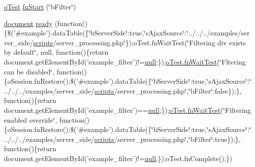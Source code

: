 \begin{DoxyCompactItemize}
\item 
\hyperlink{unit__test_8js_a3b2d259e2df3b6860d9047a92d09d0d6}{o\+Test} \hyperlink{4__server-side_2b_filter_8js_a0da0120c397d397030a4232478063c7a}{fn\+Start} (\char`\"{}b\+Filter\char`\"{})
\item 
\hyperlink{outside_events_8js_aa14f8e0338cced6720590fd2ea13bd4b}{document} \hyperlink{4__server-side_2b_filter_8js_a56d647830c74c3ec61e1308fc1071f55}{ready} (function()\{\$('\#example').data\+Table(\{\char`\"{}b\+Server\+Side\char`\"{}\+:true,\char`\"{}s\+Ajax\+Source\char`\"{}\+:\char`\"{}../../../examples/server\+\_\+side/\hyperlink{tinymce_8jquery_8dev_8js_a09066d4d580eeec222f858d588b4cdef}{scripts}/server\+\_\+processing.\+php\char`\"{}\});o\+Test.\+fn\+Wait\+Test(\char`\"{}Filtering div exists by default\char`\"{}, null, function()\{return document.\+get\+Element\+By\+Id('example\+\_\+filter')!=\hyperlink{validate_8js_afb8e110345c45e74478894341ab6b28e}{null};\});\hyperlink{onhold_24__server-side_2__zero__config_8js_ab25c4d596771c0133cdc45178ce72c3d}{o\+Test.\+fn\+Wait\+Test}(\char`\"{}Fltering can be disabled\char`\"{}, function()\{o\+Session.\+fn\+Restore();\$('\#example').data\+Table(\{\char`\"{}b\+Server\+Side\char`\"{}\+:true,\char`\"{}s\+Ajax\+Source\char`\"{}\+:\char`\"{}../../../examples/server\+\_\+side/\hyperlink{tinymce_8jquery_8dev_8js_a09066d4d580eeec222f858d588b4cdef}{scripts}/server\+\_\+processing.\+php\char`\"{},\char`\"{}b\+Filter\char`\"{}\+:false\});\}, function()\{return document.\+get\+Element\+By\+Id('example\+\_\+filter')==\hyperlink{validate_8js_afb8e110345c45e74478894341ab6b28e}{null};\});\hyperlink{onhold_24__server-side_2__zero__config_8js_ab25c4d596771c0133cdc45178ce72c3d}{o\+Test.\+fn\+Wait\+Test}(\char`\"{}Filtering enabled override\char`\"{}, function()\{o\+Session.\+fn\+Restore();\$('\#example').data\+Table(\{\char`\"{}b\+Server\+Side\char`\"{}\+:true,\char`\"{}s\+Ajax\+Source\char`\"{}\+:\char`\"{}../../../examples/server\+\_\+side/\hyperlink{tinymce_8jquery_8dev_8js_a09066d4d580eeec222f858d588b4cdef}{scripts}/server\+\_\+processing.\+php\char`\"{},\char`\"{}b\+Filter\char`\"{}\+:true\});\}, function()\{return document.\+get\+Element\+By\+Id('example\+\_\+filter')!=\hyperlink{validate_8js_afb8e110345c45e74478894341ab6b28e}{null};\});o\+Test.\+fn\+Complete();\})
\end{DoxyCompactItemize}


